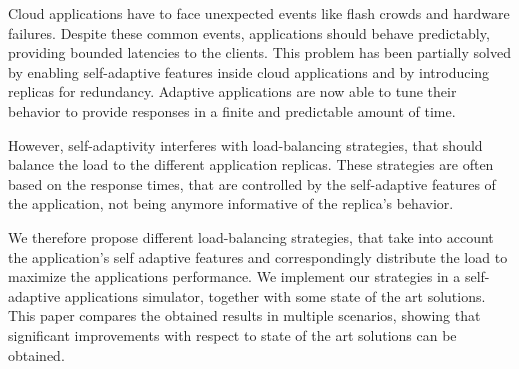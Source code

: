 Cloud applications have to face unexpected events like flash crowds
and hardware failures. Despite these common events, applications
should behave predictably, providing bounded latencies to the
clients. This problem has been partially solved by enabling
self-adaptive features inside cloud applications and by introducing
replicas for redundancy. Adaptive applications are now able to tune
their behavior to provide responses in a finite and predictable amount
of time.

However, self-adaptivity interferes with load-balancing strategies,
that should balance the load to the different application
replicas. These strategies are often based on the response times, that
are controlled by the self-adaptive features of the application, not
being anymore informative of the replica's behavior.

We therefore propose different load-balancing strategies, that take
into account the application's self adaptive features and
correspondingly distribute the load to maximize the applications
performance. We implement our strategies in a self-adaptive
applications simulator, together with some state of the art
solutions. This paper compares the obtained results in multiple
scenarios, showing that significant improvements with respect to state
of the art solutions can be obtained.
